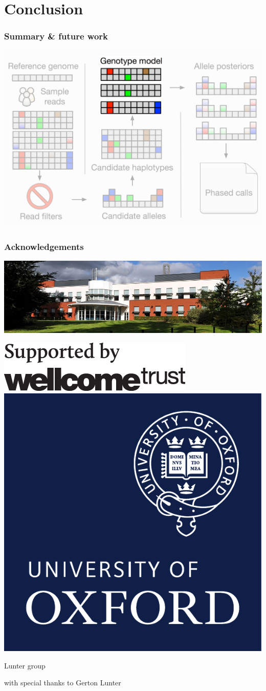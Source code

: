 \documentclass{beamer}
\begin{document}
\section{Conclusion}

\begin{frame}
\frametitle{Summary \& future work}
\begin{center}
    \includegraphics[width=0.95\linewidth]{images/octopus_future}
\end{center}
\end{frame}


\begin{frame}
\frametitle{Acknowledgements}

\includegraphics[width=\linewidth]{images/wtchg}

\begin{center}
    \includegraphics[width=0.2\linewidth]{images/wtchg_logo}
    \hspace{1cm}
    \includegraphics[width=0.1\linewidth]{images/oxford_logo}
\end{center}

\centerline{Lunter group}
\centerline{with special thanks to Gerton Lunter}
\end{frame}

\end{document}
